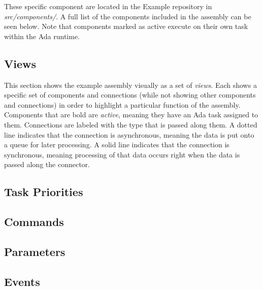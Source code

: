 These specific component are located in the Example repository in \textit{src/components/}. A full list of the components included in the assembly can be seen below. Note that components marked as active execute on their own task within the Ada runtime.



\subsection{Views}

This section shows the example assembly visually as a set of \textit{views}. Each shows a specific set of components and connections (while not showing other components and connections) in order to highlight a particular function of the assembly. Components that are bold are \textit{active}, meaning they have an Ada task assigned to them. Connections are labeled with the type that is passed along them. A dotted line indicates that the connection is asynchronous, meaning the data is put onto a queue for later processing. A solid line indicates that the connection is synchronous, meaning processing of that data occurs right when the data is passed along the connector.



\subsection{Task Priorities}


\subsection{Commands}



\subsection{Parameters}



\subsection{Events}



